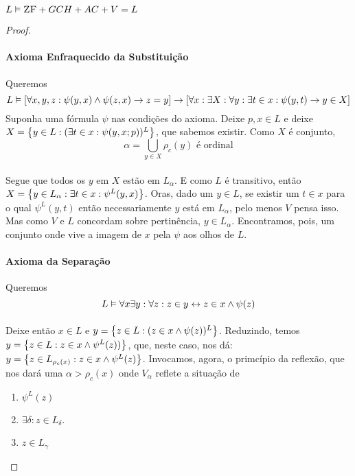 \begin{theorem}{$L\vDash\text{\sc ZF}+GCH+AC+V=L$}
\begin{proof}
                \paragraph{Axioma Enfraquecido da Substituição}\nl
                    Queremos
                    $$L\vDash[\forall x, y, z:\psi(y, x)\land\psi(z,x)\rightarrow z=y]\rightarrow[\forall x:\exists X:\forall y:\exists t\in x:\psi(y,t)\rightarrow y\in X]$$
                    Suponha uma fórmula $\psi$ nas condições do axioma. Deixe $p,x\in L$ e deixe $X=\SET{y\in L:(\exists t\in x: \psi(y,x; p))^L}$, 
                    que sabemos existir. Como $X$ é conjunto, 
                    $$\alpha = \bigcup_{y\in X}\rho_c(y)\text{ é ordinal}$$
                \paragraph{}
                    Segue que todos os $y$ em $X$ estão em $L_\alpha$. E como $L$ é transitivo, 
                    então $X = \SET{y\in L_\alpha :\exists t\in x: \psi^L(y,x)}$. Oras, dado um $y\in L$, se existir um $t\in x$ para o qual
                    $\psi^L(y,t)$ então necessariamente $y$ está em $L_\alpha$, pelo menos $V$ pensa isso. Mas como $V$ e $L$ concordam sobre 
                    pertinência, $y\in L_\alpha$. Encontramos, pois, um conjunto onde vive a imagem de $x$ pela $\psi$ aos olhos de $L$.
                \paragraph{Axioma da Separação}\nl
                    Queremos
                    $$L\vDash\forall x\exists y:\forall z:z\in y\leftrightarrow z\in x\land \psi(z)$$
                \paragraph{}
                    Deixe então $x\in L$ e $y=\SET{z\in L:(z\in x\land\psi(z))^L}$. Reduzindo, temos $y=\SET{z\in L:z\in x\land\psi^L(z))}$, 
                    que, neste caso, nos dá: $y=\SET{z\in L_{\rho_c(x)}:z\in x\land\psi^L(z)}$. Invocamos, agora, o primcípio da reflexão, que 
                    nos dará uma $\alpha > \rho_c(x)$ onde $V_\alpha$ reflete a situação de 
                \begin{enumerate}
                    \item $\psi^L(z)$ 
                    \item $\exists\delta:z\in L_\delta$.
                    \item $z\in L_\gamma$
                \end{enumerate}

\end{proof}
\end{theorem}
